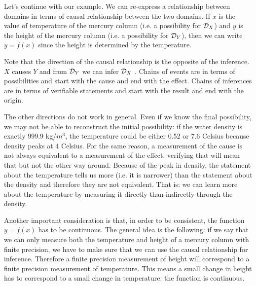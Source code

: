 Let's continue with our example. We can re-express a relationship between domains in terms of causal relationship between the two domains. If $x$ is the value of temperature of the mercury column (i.e. a possibility for $\mathcal{D}_X$) and $y$ is the height of the mercury column (i.e. a possibility for $\mathcal{D}_Y$), then we can write $y=f(x)$ since the height is determined by the temperature.

Note that the direction of the causal relationship is the opposite of the inference. $X$ causes $Y$ and from $\mathcal{D}_Y$ we can infer $\mathcal{D}_X$ . Chains of events are in terms of possibilities and start with the cause and end with the effect. Chains of inferences are in terms of verifiable statements and start with the result and end with the origin.

The other directions do not work in general. Even if we know the final possibility, we may not be able to reconstruct the initial possibility: if the water density is exactly 999.9 kg/$m^3$, the temperature could be either 0.52 or 7.6 Celsius because density peaks at 4 Celsius. For the same reason, a measurement of the cause is not always equivalent to a measurement of the effect: verifying that  will mean that  but not the other way around. Because of the peak in density, the statement about the temperature tells us more (i.e. it is narrower) than the statement about the density and therefore they are not equivalent. That is: we can learn more about the temperature by measuring it directly than indirectly through the density.

Another important consideration is that, in order to be consistent, the function $y=f(x)$ has to be continuous. The general idea is the following: if we say that we can only measure both the temperature and height of a mercury column with finite precision, we have to make sure that we can use the causal relationship for inference. Therefore a finite precision measurement of height will correspond to a finite precision measurement of temperature. This means a small change in height has to correspond to a small change in temperature: the function is continuous.

